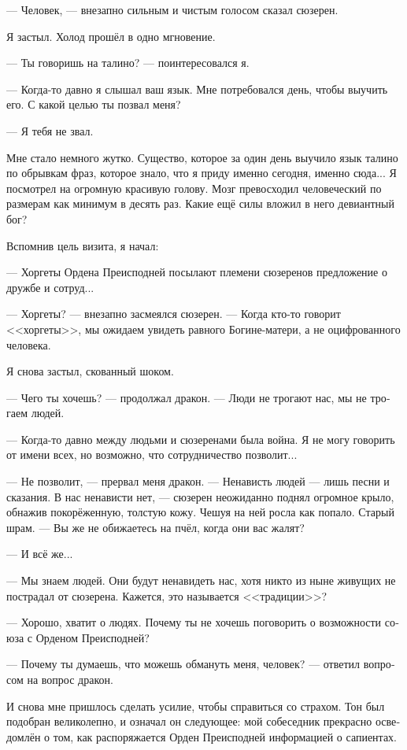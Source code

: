 \documentclass[a4paper,12pt,fleqn]{book}\usepackage{cooltooltips}\usepackage{polyglossia}\setdefaultlanguage[babelshorthands=true]{russian}\setotherlanguage{english}\defaultfontfeatures{Ligatures=TeX,Mapping=tex-text} \usepackage{xcolor}\definecolor{lightgray}{HTML}{bbbbbb}\color{lightgray}\newcommand{\ml}[3]{\textenglish{\textcolor{black}{#3}}}
\begin{document}
--- Человек, --- внезапно сильным и чистым голосом сказал сюзерен.

Я застыл.
Холод прошёл в одно мгновение.

--- Ты говоришь на талино? --- поинтересовался я.

--- Когда-то давно я слышал ваш язык.
Мне потребовался день, чтобы выучить его.
С какой целью ты позвал меня?

--- Я тебя не звал.

Мне стало немного жутко.
Существо, которое за один день выучило язык талино по обрывкам фраз, которое знало, что я приду именно сегодня, именно сюда...
Я посмотрел на огромную красивую голову.
Мозг превосходил человеческий по размерам как минимум в десять раз.
Какие ещё силы вложил в него девиантный бог?

Вспомнив цель визита, я начал:

--- Хоргеты Ордена Преисподней посылают племени сюзеренов предложение о дружбе и сотруд...

--- Хоргеты? --- внезапно засмеялся сюзерен.
--- Когда кто-то говорит <<хоргеты>>, мы ожидаем увидеть равного Богине-матери, а не оцифрованного человека.

Я снова застыл, скованный шоком.

--- Чего ты хочешь? --- продолжал дракон.
--- Люди не трогают нас, мы не трогаем людей.

--- Когда-то давно между людьми и сюзеренами была война.
Я не могу говорить от имени всех, но возможно, что сотрудничество позволит...

--- Не позволит, --- прервал меня дракон.
--- Ненависть людей --- лишь песни и сказания.
В нас ненависти нет, --- сюзерен неожиданно поднял огромное крыло, обнажив покорёженную, толстую кожу.
Чешуя на ней росла как попало.
Старый шрам.
--- Вы же не обижаетесь на пчёл, когда они вас жалят?

--- И всё же...

--- Мы знаем людей.
Они будут ненавидеть нас, хотя никто из ныне живущих не пострадал от сюзерена.
Кажется, это называется <<традиции>>?

--- Хорошо, хватит о людях.
Почему ты не хочешь поговорить о возможности союза с Орденом Преисподней?

--- Почему ты думаешь, что можешь обмануть меня, человек? --- ответил вопросом на вопрос дракон.

И снова мне пришлось сделать усилие, чтобы справиться со страхом.
Тон был подобран великолепно, и означал он следующее: мой собеседник прекрасно осведомлён о том, как распоряжается Орден Преисподней информацией о сапиентах.
\end{document}
